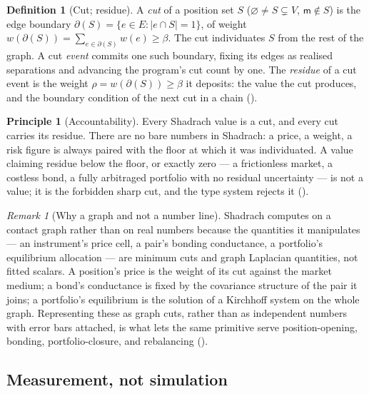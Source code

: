 \documentclass[11pt,a4paper]{article}
\theoremstyle{thmstyle}
\theoremstyle{definition}
\newtheorem{definition}[theorem]{Definition}
\newtheorem{principle}[theorem]{Principle}
\theoremstyle{remark}
\newtheorem{remark}[theorem]{Remark}
\newcommand{\V}{V}
\newcommand{\E}{E}
\newcommand{\wt}{w}
\newcommand{\flo}{\beta}
\newcommand{\res}{\rho}
\newcommand{\cut}{\partial}
\newcommand{\medium}{\mathsf{m}}
\newcommand{\abs}[1]{\lvert#1\rvert}
\begin{document}
\begin{definition}[Cut; residue]
\label{def:cut}
A \emph{cut} of a position set $S$ ($\varnothing\neq S\subsetneq\V$,
$\medium\notin S$) is the edge boundary
$\cut(S)=\{e\in\E:\abs{e\cap S}=1\}$, of weight
$\wt(\cut(S))=\sum_{e\in\cut(S)}\wt(e)\ge\flo$. The cut individuates $S$
from the rest of the graph. A cut \emph{event} commits one such
boundary, fixing its edges as realised separations and advancing the
program's cut count by one. The \emph{residue} of a cut event is the
weight $\res=\wt(\cut(S))\ge\flo$ it deposits: the value the cut
produces, and the boundary condition of the next cut in a chain
().
\end{definition}

\begin{principle}[Accountability]
\label{prin:accountability}
Every Shadrach value is a cut, and every cut carries its residue. There
are no bare numbers in Shadrach: a price, a weight, a risk figure is
always paired with the floor at which it was individuated. A value
claiming residue below the floor, or exactly zero --- a frictionless
market, a costless bond, a fully arbitraged portfolio with no residual
uncertainty --- is not a value; it is the forbidden sharp cut, and the
type system rejects it ().
\end{principle}

\begin{remark}[Why a graph and not a number line]
\label{rem:why-graph}
Shadrach computes on a contact graph rather than on real numbers because
the quantities it manipulates --- an instrument's price cell, a pair's
bonding conductance, a portfolio's equilibrium allocation --- are
minimum cuts and graph Laplacian quantities, not fitted scalars. A
position's price is the weight of its cut against the market medium; a
bond's conductance is fixed by the covariance structure of the pair it
joins; a portfolio's equilibrium is the solution of a Kirchhoff system
on the whole graph. Representing these as graph cuts, rather than as
independent numbers with error bars attached, is what lets the same
primitive serve position-opening, bonding, portfolio-closure, and
rebalancing ().
\end{remark}

\subsection{Measurement, not simulation}
\end{document}
